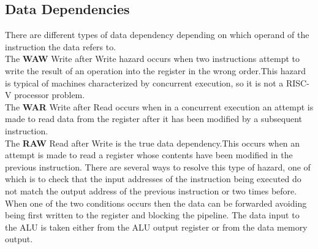 \subsection{Data Dependencies}
\label{subs:data_dep}
There are different types of data dependency depending on which operand of the instruction the data refers to.\\
The \textbf{WAW} Write after Write hazard occurs when two instructions attempt to write the result of an operation into the register in the wrong order.This hazard is typical of machines characterized by concurrent execution, so it is not a RISC-V processor problem.\\
The \textbf{WAR} Write after Read occurs when in a concurrent execution an attempt is made to read data from the register after it has been modified by a subsequent instruction. \\
The \textbf{RAW} Read after Write is the true data dependency.This occurs when an attempt is made to read a register whose contents have been modified in the previous instruction.  There are several ways to resolve this type of hazard, one of which is to check that the input addresses of the instruction being executed do not match the output address of the previous instruction or two times before. When one of the two conditions occurs then the data can be forwarded avoiding being first written to the register and blocking the pipeline. The data input to the ALU is taken either from the ALU output register or from the data memory output.